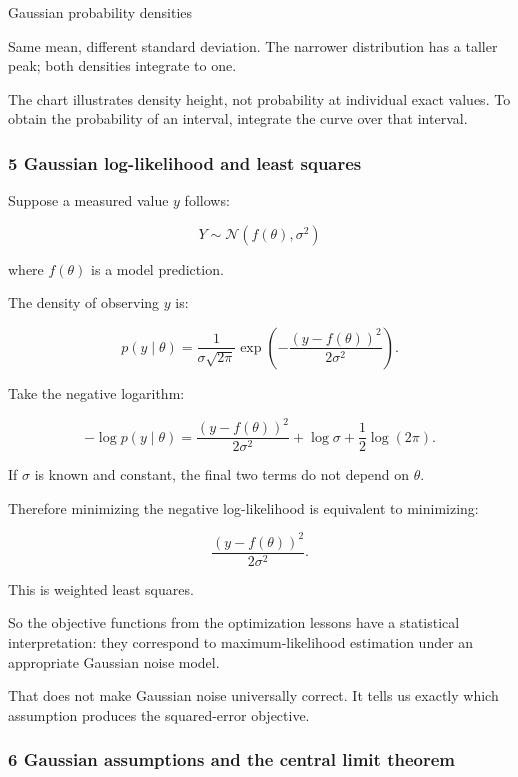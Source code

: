 \hypertarget{02-foundations-ii-ch023-gaussian-shapes}{}

Gaussian probability densities

Same mean, different standard deviation. The narrower distribution has a taller peak; both densities integrate to one.

The chart illustrates density height, not probability at individual exact values. To obtain the probability of an interval, integrate the curve over that interval.

\subsubsection{5 Gaussian log-likelihood and least squares}\label{02-foundations-ii-ch023-gaussian-log-likelihood-and-least-squares}

\hypertarget{02-foundations-ii-ch023-gaussian-log-likelihood-and-least-squares}{}

Suppose a measured value \(y\) follows:

\[
 Y\sim\mathcal N(f(\theta),\sigma^2)
\]

where \(f(\theta)\) is a model prediction.

The density of observing \(y\) is:

\[
 p(y\mid\theta) = \frac1{\sigma\sqrt{2\pi}} \exp\left( -\frac{(y-f(\theta))^2}{2\sigma^2} \right).
\]

Take the negative logarithm:

\[
 -\log p(y\mid\theta) = \frac{(y-f(\theta))^2}{2\sigma^2} +\log\sigma+\frac12\log(2\pi).
\]

If \(\sigma\) is known and constant, the final two terms do not depend on \(\theta\).

Therefore minimizing the negative log-likelihood is equivalent to minimizing:

\[
 \boxed{ \frac{(y-f(\theta))^2}{2\sigma^2} }.
\]

This is weighted least squares.

So the objective functions from the optimization lessons have a statistical interpretation: they correspond to maximum-likelihood estimation under an appropriate Gaussian noise model.

That does not make Gaussian noise universally correct. It tells us exactly which assumption produces the squared-error objective.

\subsubsection{6 Gaussian assumptions and the central limit theorem}\label{02-foundations-ii-ch023-gaussian-assumptions-and-the-central-limit-theorem}

